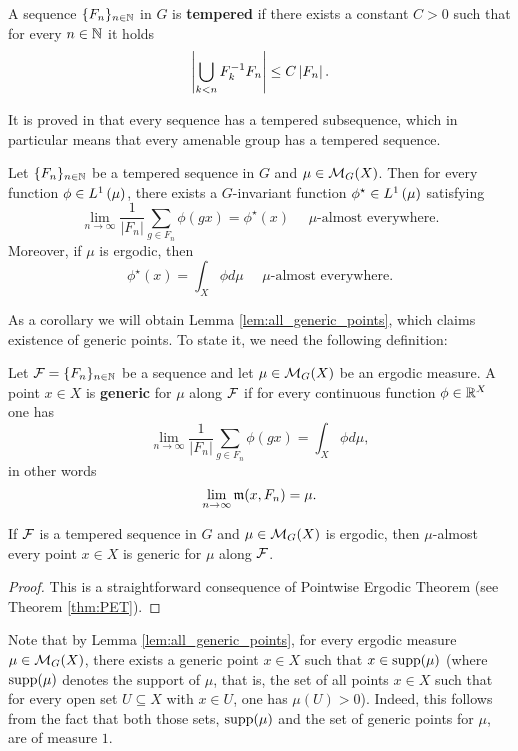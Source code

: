 \begin{defn}
A \Folner sequence $\{F_n\}_{n\in\mathbb{N}}$ in $G$ is {\bf tempered} if there exists a constant $C>0$ such that for every $n\in \mathbb{N}$ it holds
\[
\left| \bigcup_{k<n}F_k^{-1}F_n\right|\leq C\left|F_n\right|.
\]
\end{defn}
\noindent 
It is proved in \cite{Lindenstrauss01} that every \Folner sequence has a tempered subsequence, which in particular means that every amenable group has a tempered \Folner sequence. 


\begin{thm}\label{thm:PET}
Let $\{F_n\}_{n\in\mathbb{N}}$ be a tempered \Folner sequence in $G$ and $\mu\in\operatorname{\mathcal{M}}_G(X)$. Then for every function $\phi\in L^1\left(\mu\right)$, there exists a $G$-invariant function $\phi^\star\in L^1\left(\mu\right)$ satisfying
\[
\lim_{n\to\infty}\frac{1}{|F_n|}\sum_{g\in F_n}\phi(gx)=\phi^\star(x) ~~~~~~\mbox{$\mu$-almost everywhere}.
\]
Moreover, if $\mu$ is ergodic,
then 
\[
\phi^\star(x) = \int_X \phi d\mu ~~~~~~\mbox{$\mu$-almost everywhere}.
\]
\end{thm}

\noindent
As a corollary we will obtain Lemma \ref{lem:all_generic_points}, which claims existence of generic points. To state it, we need the following definition:
\begin{defn}
Let  $\operatorname{\mathcal{F}}=\{F_n\}_{n\in\mathbb{N}}$ be a \Folner sequence and let $\mu\in\operatorname{\mathcal{M}}_G(X)$ be an ergodic measure. A point $x\in X$ is {\bf generic} for $\mu$ along $\operatorname{\mathcal{F}}$ if for every continuous function $\phi\in \mathbb{R}^X$ one has
\[
\lim_{n\to\infty}\frac{1}{|F_n|}\sum_{g\in F_n} \phi(gx) = \int_X\phi d\mu,
\]
in other words
\[
\lim_{n\to \infty} \operatorname{\mathfrak m}(x, F_n) = \mu.
\]
\end{defn}

\begin{lem}\label{lem:all_generic_points}
If $\operatorname{\mathcal{F}}$ is a tempered \Folner sequence in $G$ and  $\mu\in\operatorname{\mathcal{M}}_G(X)$ is ergodic, then $\mu$-almost every point $x\in X$ is generic for $\mu$ along $\operatorname{\mathcal{F}}$.
\end{lem}
\begin{proof}
This is a straightforward consequence of Pointwise Ergodic Theorem (see Theorem \ref{thm:PET}).
\end{proof}

\noindent
Note that by Lemma \ref{lem:all_generic_points}, for every ergodic measure $\mu\in\operatorname{\mathcal{M}}_G(X)$, there exists a generic point $x\in X$ such that $x\in \operatorname{supp}(\mu)$ 
%
(where $\operatorname{supp}(\mu)$ denotes the support of $\mu$, that is, the set of all points $x\in X$ such that for every open set $U\subseteq X$ with $x\in U$, one has $\mu(U)>0$).
%
Indeed, this follows from the fact that both those sets, $\operatorname{supp}(\mu)$ and the set of generic points for $\mu$, are of measure $1$.


